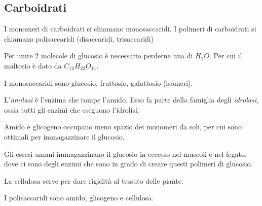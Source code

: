 \documentclass[a4paper]{article}
\begin{document}
\subsection{Carboidrati}


I monomeri di carboidrati si chiamano monosaccaridi.
I polimeri di carboidrati si chiamano polisaccaridi (disaccaridi, trisaccaridi)


Per unire 2 molecole di glucosio
è necessario perderne una di \(H_2O\). Per cui il maltosio è dato da \(C_{12}H_{22}O_{11}\).


I monosaccaridi sono glucosio, fruttosio, galattosio (isomeri).


L'\textit{amilasi} è l'enzima che rompe l'amido.
Esso fa parte della famiglia degli \textit{idrolasi}, ossia tutti gli enzimi che
eseguono l'idrolisi.


Amido e glicogeno occupano meno spazio dei monomeri da soli, per cui sono ottimali per immagazzinare
il glucosio.

Gli esseri umani immagazzinano il glucosio in eccesso nei muscoli e nel fegato, dove ci sono degli enzimi
che sono in grado di creare questi polimeri di glucosio.


La cellulosa serve per dare rigidità al tessuto delle piante.

I polisaccaridi sono amido, glicogeno e cellulosa.
\end{document}
